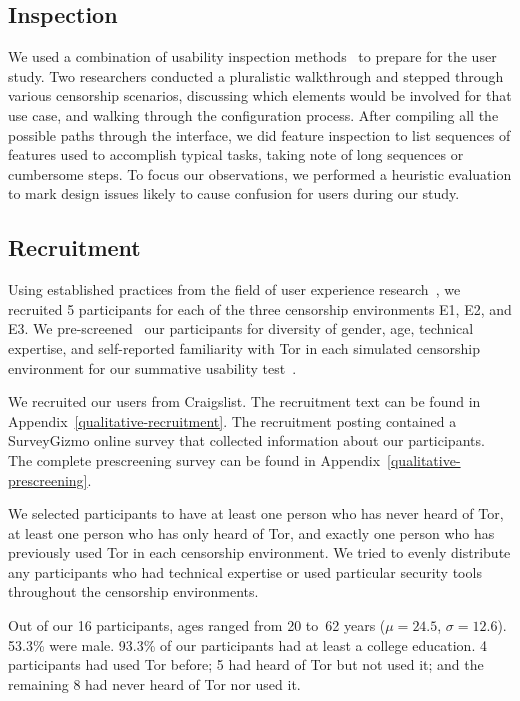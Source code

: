 \documentclass[USenglish,oneside,twocolumn]{article}
\begin{document}
\subsection{Inspection}
We used a combination of usability inspection methods~\cite{nielsen1994usability}
to prepare for the user study. Two researchers conducted a pluralistic 
walkthrough and stepped through various censorship
scenarios, discussing which elements would be involved for that use case, and walking 
through the configuration process. After compiling all the possible paths through the 
interface, we did feature inspection to list sequences
of features used to accomplish typical tasks, taking note of long sequences or cumbersome
steps. To focus our observations, we performed a heuristic evaluation to mark design issues 
likely to cause confusion for users during our study. 

\subsection{Recruitment}
Using established practices from the field of user experience research~\cite{howmanyusers},
we recruited 5 participants for each of the three censorship environments E1, E2, and E3.
We pre-screened~\cite{screening} our participants for diversity of gender, age, technical expertise,
and self-reported familiarity with Tor in each simulated censorship environment for our summative
usability test~\cite{summative}. 

We recruited our users from Craigslist. The recruitment text can be found in 
Appendix~\ref{qualitative-recruitment}. The recruitment posting contained a 
SurveyGizmo online survey that collected information about our participants.
The complete prescreening survey can be found in Appendix~\ref{qualitative-prescreening}.  

We selected participants to have
at least one person who has never heard of Tor, at least one person who has 
only heard of Tor, and exactly one person who has previously used Tor in each
censorship
environment. We tried to evenly distribute any participants who had technical
expertise or used particular security tools throughout the censorship environments. 

Out of our 16 participants, ages ranged from 20 to~62 years
($\mu = 24.5$, $\sigma = 12.6$). 53.3\% were male. 
93.3\% of our participants had at least
a college education.
4 participants had used Tor before;
5 had heard of Tor but not used it;
and the remaining 8 had never heard of Tor nor used it.
\end{document}
